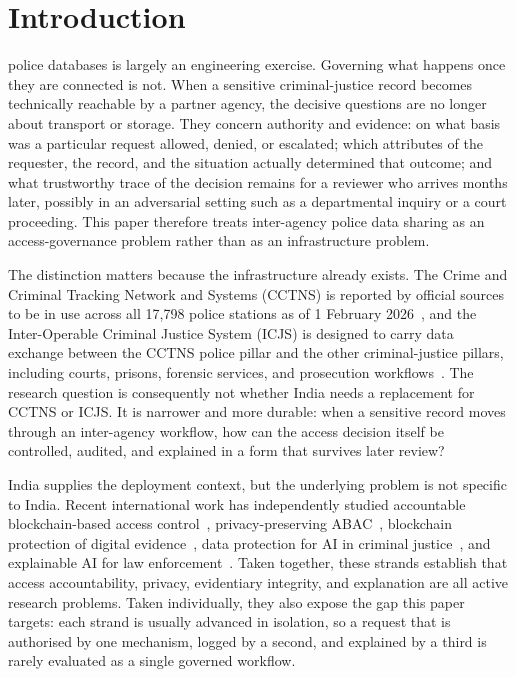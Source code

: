 \section{Introduction}

 police databases is largely an engineering exercise.
Governing what happens once they are connected is not. When a sensitive
criminal-justice record becomes technically reachable by a partner agency, the
decisive questions are no longer about transport or storage. They concern
authority and evidence: on what basis was a particular request allowed, denied,
or escalated; which attributes of the requester, the record, and the situation
actually determined that outcome; and what trustworthy trace of the decision
remains for a reviewer who arrives months later, possibly in an adversarial
setting such as a departmental inquiry or a court proceeding. This paper
therefore treats inter-agency police data sharing as an access-governance
problem rather than as an infrastructure problem.

The distinction matters because the infrastructure already exists. The Crime
and Criminal Tracking Network and Systems (CCTNS) is reported by official
sources to be in use across all 17,798 police stations as of 1 February
2026~\cite{pib_cctns_2026}, and the Inter-Operable Criminal Justice System
(ICJS) is designed to carry data exchange between the CCTNS police pillar and
the other criminal-justice pillars, including courts, prisons, forensic
services, and prosecution workflows~\cite{mha_icjs_2026}. The research question
is consequently not whether India needs a replacement for CCTNS or ICJS. It is
narrower and more durable: when a sensitive record moves through an
inter-agency workflow, how can the access decision itself be controlled,
audited, and explained in a form that survives later review?

India supplies the deployment context, but the underlying problem is not
specific to India. Recent international work has independently studied
accountable blockchain-based access control~\cite{hu_accountable_private_ac_2024},
privacy-preserving ABAC~\cite{kerl_privacy_abac_2025}, blockchain protection of
digital evidence~\cite{banerjee_dashdikpala_2026}, data protection for AI in
criminal justice~\cite{anbarasi_ai_criminal_justice_2026}, and explainable AI
for law enforcement~\cite{zocholl_xai_law_enforcement_2025}. Taken together,
these strands establish that access accountability, privacy, evidentiary
integrity, and explanation are all active research problems. Taken
individually, they also expose the gap this paper targets: each strand is
usually advanced in isolation, so a request that is authorised by one
mechanism, logged by a second, and explained by a third is rarely evaluated as
a single governed workflow.

